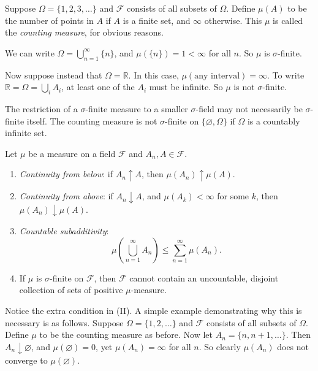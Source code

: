 \documentclass[11pt,fleqn]{book} %
\begin{document}
\begin{example} \label{ex:counting-measure}
	Suppose $\Omega = \{1,2,3,\dots\}$ and $\mathcal{F}$ consists of all subsets of $\Omega$. Define $\mu(A)$ to be the number of points in $A$ if $A$ is a finite set, and $\infty$ otherwise. This $\mu$ is called the \emph{counting measure}, for obvious reasons.

	We can write $\Omega = \bigcup_{n=1}^\infty \{n\}$, and $\mu(\{n\}) = 1 < \infty$ for all $n$. So $\mu$ is $\sigma$-finite.

	Now suppose instead that $\Omega = \mathbb{R}$. In this case, $\mu(\textrm{any interval}) = \infty$. To write $\mathbb{R} = \Omega = \bigcup_i A_i$, at least one of the $A_i$ must be infinite. So $\mu$ is not $\sigma$-finite.
\end{example}

\begin{example} \label{ex:sigma-finite-measure-restricting}
	The restriction of a $\sigma$-finite measure to a smaller $\sigma$-field may not necessarily be $\sigma$-finite itself. The counting measure is not $\sigma$-finite on $\{\varnothing, \Omega\}$ if $\Omega$ is a countably infinite set.
\end{example}

\begin{theorem} \label{thm:measure-properties}
	Let $\mu$ be a measure on a field $\mathcal{F}$ and $A_n, A \in \mathcal{F}$.
	\begin{enumerate}[label=(\Roman*)]
		\item \emph{Continuity from below}: if $A_n \uparrow A$, then $\mu(A_n) \uparrow \mu(A)$.
		\item \emph{Continuity from above}: if $A_n \downarrow A$, and $\mu(A_k) < \infty$ for some $k$, then $\mu(A_n) \downarrow \mu(A)$.
		\item \emph{Countable subadditivity}:
		\[
			\mu \left( \bigcup_{n=1}^\infty A_n \right) \leq \sum_{n=1}^\infty \mu(A_n).
		\]
		\item If $\mu$ is $\sigma$-finite on $\mathcal{F}$, then $\mathcal{F}$ cannot contain an uncountable, disjoint collection of sets of positive $\mu$-measure.
	\end{enumerate}
\end{theorem}

Notice the extra condition in (II). A simple example demonstrating why this is necessary is as follows. Suppose $\Omega = \{1,2,\dots\}$ and $\mathcal{F}$ consists of all subsets of $\Omega$. Define $\mu$ to be the counting measure as before. Now let $A_n = \{n,n+1,\dots\}$. Then $A_n \downarrow \varnothing$, and $\mu(\varnothing) = 0$, yet $\mu(A_n) = \infty$ for all $n$. So clearly $\mu(A_n)$ does not converge to $\mu(\varnothing)$.
\end{document}

